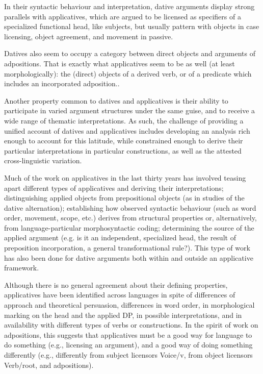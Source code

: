 \documentclass[output=paper,colorlinks,citecolor=brown,nonflat]{./langscibook}
\begin{document}
In their syntactic behaviour and interpretation, dative arguments display strong parallels with applicatives, which are argued to be licensed as specifiers of a specialized functional head, like subjects, but usually pattern with objects in case licensing, object agreement, and movement in passive.

Datives also seem to occupy a category between direct objects and arguments of adpositions. That is exactly what applicatives seem to be as well (at least morphologically): the (direct) objects of a derived verb, or of a predicate which includes an incorporated adposition..

Another property common to datives and applicatives is their ability to participate in varied argument structures under the same guise, and to receive a wide range of thematic interpretations. As such, the challenge of providing a unified account of datives and applicatives includes developing an analysis rich enough to account for this latitude, while constrained enough to derive their particular interpretations in particular constructions, as well as the attested cross-linguistic variation.

Much of the work on applicatives in the last thirty years has involved teasing apart different types of applicatives and deriving their interpretations; distinguishing applied objects from prepositional objects (as in studies of the dative alternation); establishing how observed syntactic behaviour (such as word order, movement, scope, etc.) derives from structural properties or, alternatively, from language-particular morphosyntactic coding; determining the source of the applied argument (e.g. is it an independent, specialized head, the result of preposition incorporation, a general transformational rule?). This type of work has also been done for dative arguments both within and outside an applicative framework.

Although there is no general agreement about their defining properties, applicatives have been identified across languages in spite of differences of approach and theoretical persuasion, differences in word order, in morphological marking on the head and the applied DP, in possible interpretations, and in availability with different types of verbs or constructions. In the spirit of  work on adpositions, this suggests that applicatives must be a good way for language to do something (e.g., licensing an argument), and a good way of doing something differently (e.g., differently from subject licensors Voice/v, from object licensors Verb/root, and adpositions).
\end{document}
